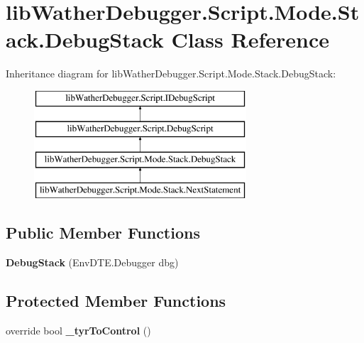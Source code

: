 \hypertarget{classlib_wather_debugger_1_1_script_1_1_mode_1_1_stack_1_1_debug_stack}{\section{lib\+Wather\+Debugger.\+Script.\+Mode.\+Stack.\+Debug\+Stack Class Reference}
\label{classlib_wather_debugger_1_1_script_1_1_mode_1_1_stack_1_1_debug_stack}
}
Inheritance diagram for lib\+Wather\+Debugger.\+Script.\+Mode.\+Stack.\+Debug\+Stack\+:\begin{figure}[H]
\begin{center}
\leavevmode
\includegraphics[height=4.000000cm]{classlib_wather_debugger_1_1_script_1_1_mode_1_1_stack_1_1_debug_stack}
\end{center}
\end{figure}
\subsection*{Public Member Functions}
\begin{DoxyCompactItemize}
\item 
\hypertarget{classlib_wather_debugger_1_1_script_1_1_mode_1_1_stack_1_1_debug_stack_a547f54e381e89b009532272888a5436d}{{\bfseries Debug\+Stack} (Env\+D\+T\+E.\+Debugger dbg)}\label{classlib_wather_debugger_1_1_script_1_1_mode_1_1_stack_1_1_debug_stack_a547f54e381e89b009532272888a5436d}

\end{DoxyCompactItemize}
\subsection*{Protected Member Functions}
\begin{DoxyCompactItemize}
\item 
\hypertarget{classlib_wather_debugger_1_1_script_1_1_mode_1_1_stack_1_1_debug_stack_ab757603b4db6688b39e083d6da0a75c6}{override bool {\bfseries \+\_\+tyr\+To\+Control} ()}\label{classlib_wather_debugger_1_1_script_1_1_mode_1_1_stack_1_1_debug_stack_ab757603b4db6688b39e083d6da0a75c6}

\end{DoxyCompactItemize}
